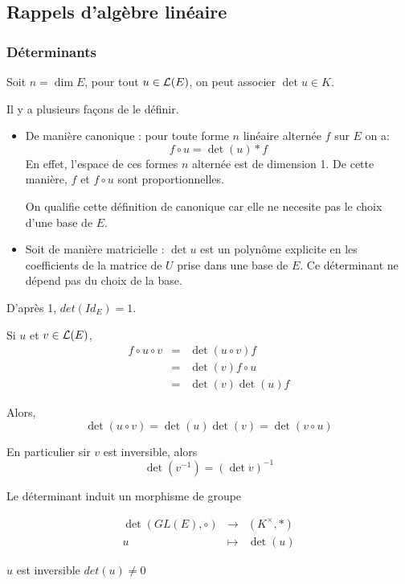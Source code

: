 \subsection{Rappels d'algèbre linéaire}

\subsubsection{Déterminants} %


Soit $n = \dim E$, pour tout $u \in \mathcal{L}(E)$, on peut associer $\det u \in K$.

Il y a plusieurs façons de le définir.


\begin{itemize}
	\item De manière canonique : pour toute forme $n$ linéaire alternée $f$ sur $E$ on a:
	      $$ f \circ u = \det (u) * f$$
	      En effet, l'espace de ces formes $n$ alternée est de dimension 1. De cette manière, $f$ et $f \circ u$ sont proportionnelles.

	      On qualifie cette définition de canonique car elle ne necesite pas le choix d'une base de $E$.

	\item Soit de manière matricielle : $\det u$ est un polynôme explicite en les coefficients de la matrice de $U$ prise dans une base de $E$.
	      Ce déterminant ne dépend pas du choix de la base.
\end{itemize}


D'après 1, $det (Id_E) = 1$.

Si $u$ et $v \in \mathcal{L}(E)$,
\begin{eqnarray*}
	f \circ u \circ v &=& \det (u \circ v) f \\
	&=& \det (v) f  \circ u \\
	&=& \det (v) \det (u) f
\end{eqnarray*}

Alors,
$$\det (u \circ v) = \det (u) \det (v) = \det (v \circ u) $$

En particulier sir $v$ est inversible, alors
$$ \det (v^{-1}) = (\det v )^{-1} $$

Le déterminant induit un morphisme de groupe


\begin{eqnarray*}
	\det (GL(E), \circ) &\to& (K^{\times}, *)\\
	u &\mapsto& \det (u)
\end{eqnarray*}

$u$ est inversible \ssi $det(u) \neq 0$

